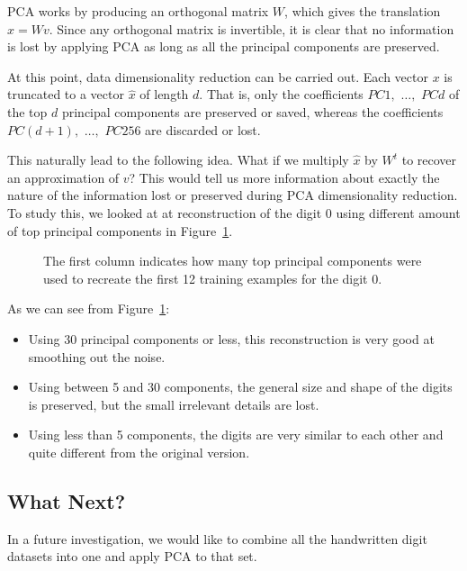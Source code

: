 \documentclass[12pt,article,oneside]{memoir}
\begin{document}
PCA works by producing an orthogonal matrix $W$, which gives the translation $x = Wv$. Since any orthogonal matrix is invertible, it is clear that no information is lost by applying PCA as long as all the principal components are preserved.

At this point, data dimensionality reduction can be carried out. Each vector $x$ is truncated to a vector $\hat{x}$ of length $d$. That is, only the coefficients $PC1,$ $\ldots,$ $PCd$ of the top $d$ principal components are preserved or saved, whereas the coefficients $PC(d+1),$ $\ldots,$ $PC256$ are discarded or lost.

This naturally lead to the following idea. What if we multiply $\hat{x}$ by $W^t$ to recover an approximation of $v$? This would tell us more information about exactly the nature of the information lost or preserved during PCA dimensionality reduction. To study this, we looked at at reconstruction of the digit $0$ using different amount of top principal components in Figure~\ref{fig:recreate-gradual-digit-0}.

\begin{figure}[H]
	\caption{The first column indicates how many top principal components were used to recreate the first 12 training examples for the digit 0.}
	\label{fig:recreate-gradual-digit-0}
\end{figure}

As we can see from Figure~\ref{fig:recreate-gradual-digit-0}:
\begin{itemize}
	\item Using 30 principal components or less, this reconstruction is very good at smoothing out the noise.
	\item Using between 5 and 30 components, the general size and shape of the digits is preserved, but the small irrelevant details are lost.
	\item Using less than 5 components, the digits are very similar to each other and quite different from the original version.
\end{itemize}

\subsection{What Next?}

In a future investigation, we would like to combine all the handwritten digit datasets into one and apply PCA to that set. 
\end{document}

